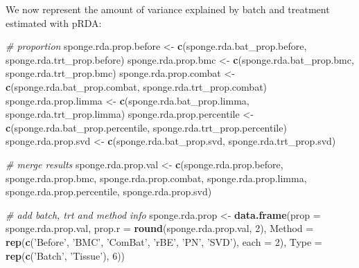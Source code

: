 \documentclass[]{book}
\newenvironment{Shaded}{\begin{snugshade}}{\end{snugshade}}
\newcommand{\KeywordTok}[1]{\textcolor[rgb]{0.13,0.29,0.53}{\textbf{#1}}}
\newcommand{\DataTypeTok}[1]{\textcolor[rgb]{0.13,0.29,0.53}{#1}}
\newcommand{\DecValTok}[1]{\textcolor[rgb]{0.00,0.00,0.81}{#1}}
\newcommand{\StringTok}[1]{\textcolor[rgb]{0.31,0.60,0.02}{#1}}
\newcommand{\CommentTok}[1]{\textcolor[rgb]{0.56,0.35,0.01}{\textit{#1}}}
\newcommand{\NormalTok}[1]{#1}
\begin{document}
We now represent the amount of variance explained by batch and treatment
estimated with pRDA:

\begin{Shaded}
\begin{Highlighting}[]
\CommentTok{# proportion}
\NormalTok{sponge.rda.prop.before <-}\StringTok{ }\KeywordTok{c}\NormalTok{(sponge.rda.bat_prop.before, }
\NormalTok{                           sponge.rda.trt_prop.before)}
\NormalTok{sponge.rda.prop.bmc <-}\StringTok{ }\KeywordTok{c}\NormalTok{(sponge.rda.bat_prop.bmc, }
\NormalTok{                        sponge.rda.trt_prop.bmc)}
\NormalTok{sponge.rda.prop.combat <-}\StringTok{ }\KeywordTok{c}\NormalTok{(sponge.rda.bat_prop.combat, }
\NormalTok{                           sponge.rda.trt_prop.combat)}
\NormalTok{sponge.rda.prop.limma <-}\StringTok{ }\KeywordTok{c}\NormalTok{(sponge.rda.bat_prop.limma, }
\NormalTok{                          sponge.rda.trt_prop.limma)}
\NormalTok{sponge.rda.prop.percentile <-}\StringTok{ }\KeywordTok{c}\NormalTok{(sponge.rda.bat_prop.percentile, }
\NormalTok{                               sponge.rda.trt_prop.percentile)}
\NormalTok{sponge.rda.prop.svd <-}\StringTok{ }\KeywordTok{c}\NormalTok{(sponge.rda.bat_prop.svd, }
\NormalTok{                        sponge.rda.trt_prop.svd)}

\CommentTok{# merge results}
\NormalTok{sponge.rda.prop.val <-}\StringTok{ }\KeywordTok{c}\NormalTok{(sponge.rda.prop.before, sponge.rda.prop.bmc, }
\NormalTok{                        sponge.rda.prop.combat, sponge.rda.prop.limma, }
\NormalTok{                        sponge.rda.prop.percentile, sponge.rda.prop.svd)}

\CommentTok{# add batch, trt and method info}
\NormalTok{sponge.rda.prop <-}\StringTok{ }\KeywordTok{data.frame}\NormalTok{(}\DataTypeTok{prop =}\NormalTok{ sponge.rda.prop.val, }
                             \DataTypeTok{prop.r =} \KeywordTok{round}\NormalTok{(sponge.rda.prop.val, }\DecValTok{2}\NormalTok{), }
                             \DataTypeTok{Method =} \KeywordTok{rep}\NormalTok{(}\KeywordTok{c}\NormalTok{(}\StringTok{'Before'}\NormalTok{, }\StringTok{'BMC'}\NormalTok{, }\StringTok{'ComBat'}\NormalTok{, }
                                            \StringTok{'rBE'}\NormalTok{, }\StringTok{'PN'}\NormalTok{, }\StringTok{'SVD'}\NormalTok{), }\DataTypeTok{each =} \DecValTok{2}\NormalTok{), }
                             \DataTypeTok{Type =} \KeywordTok{rep}\NormalTok{(}\KeywordTok{c}\NormalTok{(}\StringTok{'Batch'}\NormalTok{, }\StringTok{'Tissue'}\NormalTok{), }\DecValTok{6}\NormalTok{))}


\end{Highlighting}
\end{Shaded}
\end{document}
